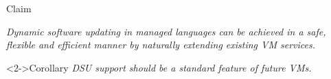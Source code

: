\begin{frame}{Claim}%
\begin{block}{}
\emph{Dynamic software updating in managed languages can be achieved in a
safe, flexible and efficient manner by naturally extending existing VM
services.}
\end{block}

\begin{block}<2->{Corollary}
\emph{DSU support should be a standard feature of future VMs.}
\end{block}
\end{frame}
